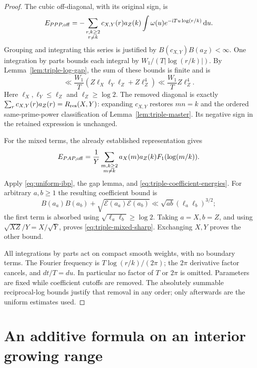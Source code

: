 \documentclass[11pt]{article}
\newcommand{\ii}{\mathrm i}
\newcommand{\dd}{\,\mathrm d}
\begin{document}
\begin{proof}
The cubic off-diagonal, with its original sign, is
\[
 E_{PPP,{\rm off}}
 =-\sum_{\substack{r,k\geq2\\r\ne k}}c_{X,Y}(r)a_Z(k)
       \int\omega(u)e^{-\ii Tu\log(r/k)}\dd u.
\]
Grouping and integrating this series is justified by
\(B(c_{X,Y})B(a_Z)<\infty\). One integration by parts bounds each
integral by \(W_1/(T|\log(r/k)|)\). By
Lemma~\ref{lem:triple-log-gap}, the sum of these bounds is finite and is
\[
 \ll\frac{W_1}{T}
 \left(Z\ell_X\ell_Y\ell_Z+Z\ell_Z^4\right)
 \ll\frac{W_1}{T}Z\ell_Z^4.
\]
Here \(\ell_X,\ell_Y\leq\ell_Z\) and \(\ell_Z\geq\log2\).
The removed diagonal is exactly
\(\sum_r c_{X,Y}(r)a_Z(r)=R_{\rm res}(X,Y)\):
expanding \(c_{X,Y}\) restores \(mn=k\) and the ordered same-prime-power
classification of Lemma~\ref{lem:triple-master}. Its negative sign in
the retained expression is unchanged.

For the mixed terms, the already established representation gives
\[
 E_{PAP,{\rm off}}=\frac1Y
 \sum_{\substack{m,k\geq2\\m\ne k}}a_X(m)a_Z(k)F_1(\log(m/k)).
\]
Apply \eqref{eq:uniform-ibp}, the gap lemma, and
\eqref{eq:triple-coefficient-energies}. For arbitrary \(a,b\geq1\)
the resulting coefficient bound is
\[
 B(a_a)B(a_b)+\sqrt{\mathcal E(a_a)\mathcal E(a_b)}
 \ll\sqrt{ab}(\ell_a\ell_b)^{3/2};
\]
the first term is absorbed using \(\sqrt{\ell_a\ell_b}\geq\log2\).
Taking \(a=X,b=Z\), and using \(\sqrt{XZ}/Y=X/\sqrt Y\), proves
\eqref{eq:triple-mixed-sharp}. Exchanging \(X,Y\) proves the other bound.

All integrations by parts act on compact smooth weights, with no
boundary terms. The Fourier frequency is \(T\log(r/k)/(2\pi)\);
the \(2\pi\) derivative factor cancels, and \(dt/T=du\).
In particular no factor of \(T\) or \(2\pi\) is omitted.
Parameters are fixed while coefficient cutoffs are removed.
The absolutely summable reciprocal-log bounds justify that removal in
any order; only afterwards are the uniform estimates used.
\end{proof}

\section{An additive formula on an interior growing range}
\end{document}
